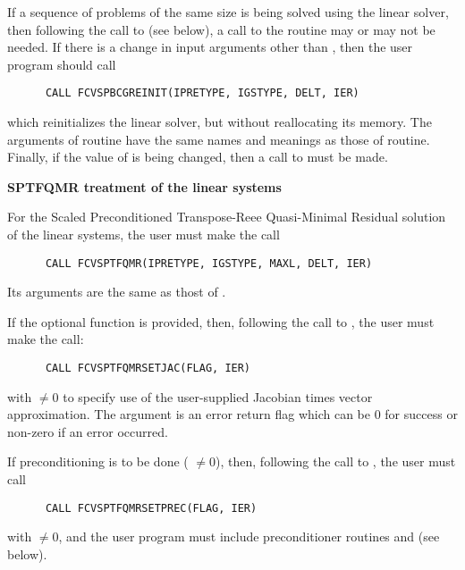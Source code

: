 \begin{Steps}
  If a sequence of problems of the same size is being solved using the {\spbcg}
  linear solver, then following the call to  (see below), a call
  to the  routine may or may not be needed.  
  If there is a change in input arguments other than , then the user 
  program should call
\begin{verbatim}
      CALL FCVSPBCGREINIT(IPRETYPE, IGSTYPE, DELT, IER)
\end{verbatim}
  which reinitializes the {\spbcg} linear solver, but without reallocating its memory.
  The arguments of  routine have the same names and meanings
  as those of  routine.  Finally, if the value of  is
  being changed, then a call to  must be made.

  
  {\s}{\p} {\bf SPTFQMR treatment of the linear systems}
  
  For the Scaled Preconditioned Transpose-Reee Quasi-Minimal Residual solution 
  of the linear systems, the user must make the call
\begin{verbatim}
      CALL FCVSPTFQMR(IPRETYPE, IGSTYPE, MAXL, DELT, IER)
\end{verbatim}
  Its arguments are the same as thost of .

  If the optional function  is provided, then, following the call to
  , the user must make the call:
\begin{verbatim}
      CALL FCVSPTFQMRSETJAC(FLAG, IER)
\end{verbatim}
  with  $\neq 0$ to specify use of the user-supplied Jacobian times
  vector approximation.
  The argument  is an error return flag which can be $0$ 
  for success or non-zero if an error occurred.
  
  If preconditioning is to be done ( $\neq 0$), then, following the
  call to , the user must call
\begin{verbatim}
      CALL FCVSPTFQMRSETPREC(FLAG, IER)
\end{verbatim}
  with  $\neq 0$, and the user program must include preconditioner routines
   and  (see below).


\end{Steps}

